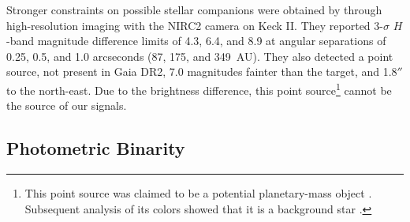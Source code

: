 \documentclass[12pt,twocolumn,tighten]{aastex62}
\begin{document}
Stronger constraints on possible
stellar companions were obtained by
\citet{van_eyken_ptf_2012} through high-resolution imaging with the NIRC2
camera on Keck II.  They reported 3-$\sigma$ $H$-band magnitude
difference limits of 4.3, 6.4, and 8.9 at angular separations of 0.25,
0.5, and 1.0 arcseconds (87, 175, and 349~AU).  They also detected a
point source, not present in Gaia DR2, 7.0 magnitudes fainter than the
target, and 1.8$''$ to the north-east.  Due to the brightness
difference, this point source\footnote{This point source was claimed
to be a potential planetary-mass object \citep{schmidt_direct_2016}.
Subsequent analysis of its colors showed that it is a background star
\citep{lee_evidence_2018}.} cannot be the source of our signals.


\subsection{Photometric Binarity}
\end{document}
